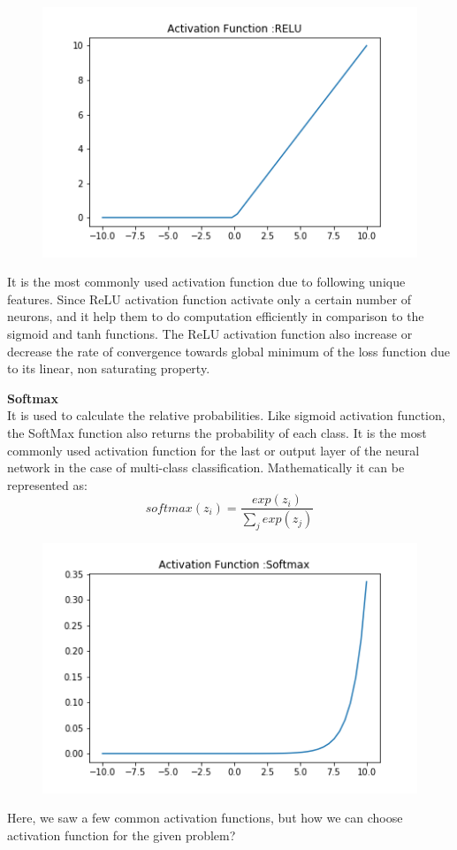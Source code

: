 \begin{figure}[H]
    \centering
    \includegraphics{Figure/RELU.png}
    \label{fig:my_label}
\end{figure}


It is the most commonly used activation  function due to following unique features. Since ReLU activation function activate only a certain number of neurons, and it help them to do computation efficiently  in comparison to the sigmoid and tanh functions\cite{https://doi.org/10.48550/arxiv.1811.03378}. The ReLU activation function also increase or decrease the rate of convergence towards global minimum of the loss function due to its linear, non saturating property\cite{https://doi.org/10.48550/arxiv.1803.08375}.

\textbf{Softmax}\\
It is used to calculate the relative probabilities. Like sigmoid activation function, the SoftMax function also returns the probability of each class.
It is the most commonly used activation function for the last or output layer of the neural network in the case of multi-class classification\cite{https://doi.org/10.48550/arxiv.1811.03378}. 
Mathematically it can be represented as:
\begin{equation}
    softmax(z_i) = \frac{exp(z_i)}{\sum_j exp(z_j)}
\end{equation}
\begin{figure}[H]
    \centering
    \includegraphics{Figure/softmax.png}
    \label{fig:my_label}
\end{figure}
Here, we saw a few common activation functions, but how we can choose activation function for the given problem? 

